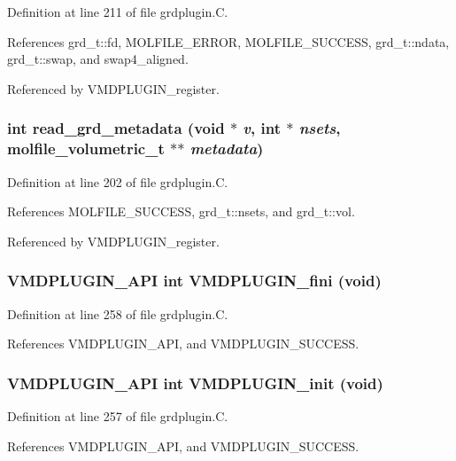 Definition at line 211 of file grdplugin.C.

References grd\_\-t::fd, MOLFILE\_\-ERROR, MOLFILE\_\-SUCCESS, grd\_\-t::ndata, grd\_\-t::swap, and swap4\_\-aligned.

Referenced by VMDPLUGIN\_\-register.
\subsubsection{\setlength{\rightskip}{0pt plus 5cm}int read\_\-grd\_\-metadata (void $\ast$ {\em v}, int $\ast$ {\em nsets}, {\bf molfile\_\-volumetric\_\-t} $\ast$$\ast$ {\em metadata})\hspace{0.3cm}{\tt  [static]}}\label{grdplugin_8C_a2}




Definition at line 202 of file grdplugin.C.

References MOLFILE\_\-SUCCESS, grd\_\-t::nsets, and grd\_\-t::vol.

Referenced by VMDPLUGIN\_\-register.
\subsubsection{\setlength{\rightskip}{0pt plus 5cm}VMDPLUGIN\_\-API int VMDPLUGIN\_\-fini (void)}\label{grdplugin_8C_a6}




Definition at line 258 of file grdplugin.C.

References VMDPLUGIN\_\-API, and VMDPLUGIN\_\-SUCCESS.
\subsubsection{\setlength{\rightskip}{0pt plus 5cm}VMDPLUGIN\_\-API int VMDPLUGIN\_\-init (void)}\label{grdplugin_8C_a5}




Definition at line 257 of file grdplugin.C.

References VMDPLUGIN\_\-API, and VMDPLUGIN\_\-SUCCESS.
